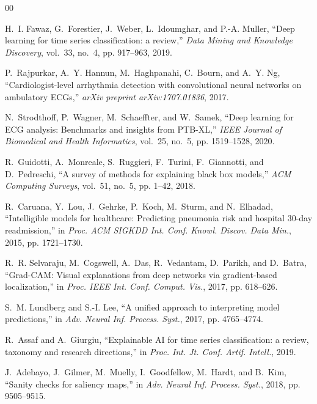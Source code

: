 \documentclass[conference]{IEEEtran}
\begin{document}
\begin{thebibliography}{00}

H.~I. Fawaz, G.~Forestier, J.~Weber, L.~Idoumghar, and P.-A. Muller, ``Deep learning for time series classification: a review,'' \emph{Data Mining and Knowledge Discovery}, vol.~33, no.~4, pp. 917--963, 2019.

P.~Rajpurkar, A.~Y. Hannun, M.~Haghpanahi, C.~Bourn, and A.~Y. Ng, ``Cardiologist-level arrhythmia detection with convolutional neural networks on ambulatory ECGs,'' \emph{arXiv preprint arXiv:1707.01836}, 2017.

N.~Strodthoff, P.~Wagner, M.~Schaeffter, and W.~Samek, ``Deep learning for ECG analysis: Benchmarks and insights from PTB-XL,'' \emph{IEEE Journal of Biomedical and Health Informatics}, vol.~25, no.~5, pp. 1519--1528, 2020.

R.~Guidotti, A.~Monreale, S.~Ruggieri, F.~Turini, F.~Giannotti, and D.~Pedreschi, ``A survey of methods for explaining black box models,'' \emph{ACM Computing Surveys}, vol.~51, no.~5, pp. 1--42, 2018.

R.~Caruana, Y.~Lou, J.~Gehrke, P.~Koch, M.~Sturm, and N.~Elhadad, ``Intelligible models for healthcare: Predicting pneumonia risk and hospital 30-day readmission,'' in \emph{Proc. ACM SIGKDD Int. Conf. Knowl. Discov. Data Min.}, 2015, pp. 1721--1730.

R.~R. Selvaraju, M.~Cogswell, A.~Das, R.~Vedantam, D.~Parikh, and D.~Batra, ``Grad-CAM: Visual explanations from deep networks via gradient-based localization,'' in \emph{Proc. IEEE Int. Conf. Comput. Vis.}, 2017, pp. 618--626.

S.~M. Lundberg and S.-I. Lee, ``A unified approach to interpreting model predictions,'' in \emph{Adv. Neural Inf. Process. Syst.}, 2017, pp. 4765--4774.

R.~Assaf and A.~Giurgiu, ``Explainable AI for time series classification: a review, taxonomy and research directions,'' in \emph{Proc. Int. Jt. Conf. Artif. Intell.}, 2019.

J.~Adebayo, J.~Gilmer, M.~Muelly, I.~Goodfellow, M.~Hardt, and B.~Kim, ``Sanity checks for saliency maps,'' in \emph{Adv. Neural Inf. Process. Syst.}, 2018, pp. 9505--9515.


\end{thebibliography}
\end{document}
